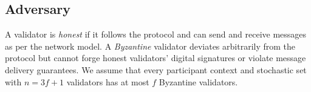 

\subsection{Adversary}
A validator is \emph{honest} if it follows the protocol and can send and receive messages as per the network model. 
A \emph{Byzantine} validator deviates arbitrarily from the protocol but cannot forge honest validators' digital signatures or violate message delivery guarantees.
We assume that every participant context and stochastic set with $n=3f+1$ validators has at most $f$ Byzantine validators. 
